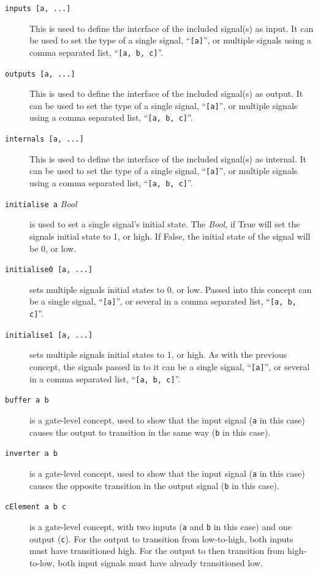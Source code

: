 \documentclass{proc}
\begin{document}
\begin{description}
   \item [\texttt{inputs [a, ...]}] This is used to define the interface of the included signal(s) as input. It can be used to set the type of a single signal, ``\texttt{[a]}'', or multiple signals   
   using a comma separated list, ``\texttt{[a, b, c]}''.
   
   \item [\texttt{outputs [a, ...]}] This is used to define the interface of the included signal(s) as output. It can be used to set the type of a single signal, ``\texttt{[a]}'', or multiple signals 
   using a comma separated list, ``\texttt{[a, b, c]}''.
   
   \item [\texttt{internals [a, ...]}] This is used to define the interface of the included signal(s) as internal. It can be used to set the type of a single signal, ``\texttt{[a]}'', or multiple 
   signals using a comma separated list, ``\texttt{[a, b, c]}''.
  
  \item [\texttt{initialise a} \emph{Bool}] is used to set a single signal's initial state. The \emph{Bool}, if True will set the signals initial state to 1, or high. If False, the initial state of the 
  signal will be 0, or low. 

  \item [\texttt{initialise0 [a, ...]}] sets multiple signals initial states to 0, or low. Passed into this concept can be a single signal, ``\texttt{[a]}'', or several in a comma separated list, 
  ``\texttt{[a, b, c]}''.
  
  \item [\texttt{initialise1 [a, ...]}] sets multiple signals initial states to 1, or high. As with the previous concept, the signals passed in to it can be a single signal, ``\texttt{[a]}'', or several 
in a comma separated list, ``\texttt{[a, b, c]}''.
  
  \item [\texttt{buffer a b}] is a gate-level concept, used to show that the input signal (\texttt{a} in this case) causes the output to transition in the same way (\texttt{b} in this case). 
  
  \item [\texttt{inverter a b}] is a gate-level concept, used to show that the input signal (\texttt{a} in this case) causes the opposite transition in the output signal (\texttt{b} in this case).
  
  \item [\texttt{cElement a b c}] is a gate-level concept, with two inputs (\texttt{a} and \texttt{b} in this case) and one output (\texttt{c}). For the output to transition from low-to-high, 
  both inputs must have transitioned high. For the output to then transition from high-to-low, both input signals must have already transitioned low.
  

\end{description}
\end{document}
